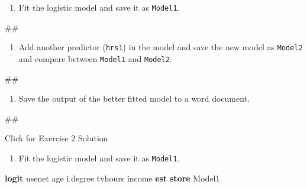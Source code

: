 \documentclass[
]{book}
\newenvironment{Shaded}{\begin{snugshade}}{\end{snugshade}}
\newcommand{\KeywordTok}[1]{\textcolor[rgb]{0.13,0.29,0.53}{\textbf{#1}}}
\newcommand{\NormalTok}[1]{#1}
\providecommand{\tightlist}{%
  \setlength{\itemsep}{0pt}\setlength{\parskip}{0pt}}
\begin{document}
\begin{enumerate}
\def\labelenumi{\arabic{enumi}.}
\tightlist
\item
  Fit the logistic model and save it as \texttt{Model1}.
\end{enumerate}

\begin{Shaded}
\begin{Highlighting}[]
\NormalTok{\#\#}
\end{Highlighting}
\end{Shaded}

\begin{enumerate}
\def\labelenumi{\arabic{enumi}.}
\setcounter{enumi}{1}
\tightlist
\item
  Add another predictor (\texttt{hrs1}) in the model and save the new model as \texttt{Model2} and compare between \texttt{Model1} and \texttt{Model2}.
\end{enumerate}

\begin{Shaded}
\begin{Highlighting}[]
\NormalTok{\#\#}
\end{Highlighting}
\end{Shaded}

\begin{enumerate}
\def\labelenumi{\arabic{enumi}.}
\setcounter{enumi}{2}
\tightlist
\item
  Save the output of the better fitted model to a word document.
\end{enumerate}

\begin{Shaded}
\begin{Highlighting}[]
\NormalTok{\#\#}
\end{Highlighting}
\end{Shaded}

{Click for Exercise 2 Solution}

\begin{enumerate}
\def\labelenumi{\arabic{enumi}.}
\tightlist
\item
  Fit the logistic model and save it as \texttt{Model1}.
\end{enumerate}

\begin{Shaded}
\begin{Highlighting}[]
\KeywordTok{logit}\NormalTok{ usenet age i.degree tvhours income }
\KeywordTok{est} \KeywordTok{store}\NormalTok{ Model1}
\end{Highlighting}
\end{Shaded}
\end{document}
